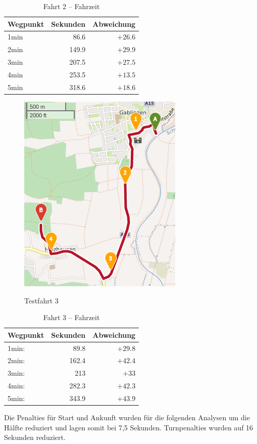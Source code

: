 \documentclass[12pt,a4paper]{article}
\begin{document}
\begin{table}[]
\centering
\caption{Fahrt 2 -- Fahrzeit}
\label{tab:drive2}
\begin{tabular}{|l|r|r|}
\hline
Wegpunkt & Sekunden & Abweichung \\ \hline 
1min & 86.6 & $+26.6$ \\
2min & 149.9 & $+29.9$ \\
3min & 207.5 & $+27.5$ \\
4min & 253.5 & $+13.5$ \\
5min & 318.6 & $+18.6$ \\
\hline
\end{tabular}
\end{table}


\begin{figure}[h]
\centering
\caption{Testfahrt 3}
\label{drive3}
\includegraphics[width = 0.40 \textwidth]{../media/Fahrt3crop.png} \\
\end{figure}

\begin{table}[]
\centering
\caption{Fahrt 3 -- Fahrzeit}
\label{tab:drive3}
\begin{tabular}{|l|r|r|}
\hline
Wegpunkt & Sekunden & Abweichung \\ \hline 
1min: &  89.8 & $+29.8$ \\
2min: &  162.4 & $+42.4$ \\
3min: &  213 & $+33$ \\
4min: &  282.3 & $+42.3$ \\
5min: &  343.9 & $+43.9$ \\
\hline
\end{tabular}
\end{table}

Die Penalties für Start und Ankunft wurden für die folgenden Analysen um die Hälfte reduziert und lagen somit bei 7,5 Sekunden. Turnpenalties wurden auf 16 Sekunden reduziert. 
\end{document}
